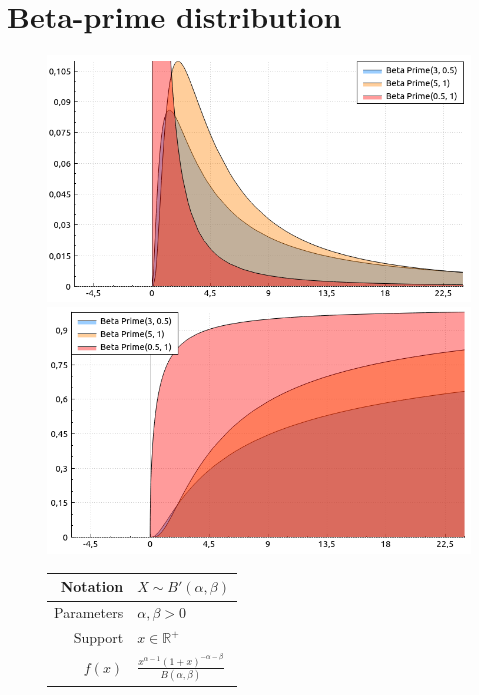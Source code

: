 \documentclass[a4paper,11pt]{article}
\theoremstyle{plain}
\theoremstyle{definition}
\newcommand{\MR}{\mathbb{R}}
\begin{document}
	\section{Beta-prime distribution}
		\begin{figure}[!htb]\centering
		\begin{minipage}{0.55\textwidth}
			\includegraphics[width=\linewidth, right]{beta_prime_pdf}
			\captionsetup{labelformat=empty}
			\includegraphics[width=\linewidth, right]{beta_prime_cdf}
			\captionsetup{labelformat=empty}
		\end{minipage}
		\begin{minipage}{0.4\textwidth}
			\begin{tabular}{| r | l |}
				\hline
				Notation & $X \sim B'(\alpha, \beta)$ \\
				\hline
				Parameters & $\alpha, \beta > 0$ \\
				\hline
				Support & $x \in \MR^+$  \\
				\hline
				$f(x)$ & $\frac{x^{\alpha - 1}(1 + x)^{-\alpha - \beta}}{B(\alpha, \beta)}$ \\

\end{tabular}
\end{minipage}
\end{figure}
\end{document}
